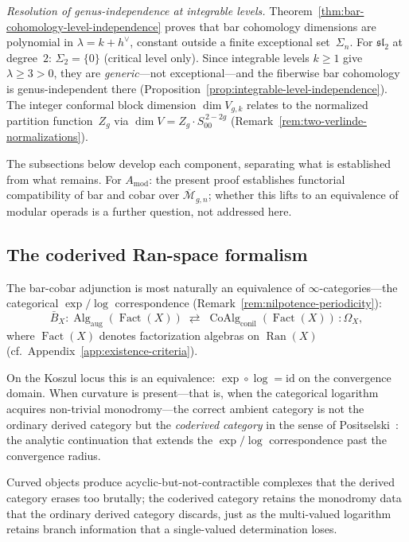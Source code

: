 \begin{remark}
\smallskip\noindent
\emph{Resolution of genus-independence at integrable levels.}
Theorem~\ref{thm:bar-cohomology-level-independence} proves that
bar cohomology dimensions are polynomial in $\lambda = k + h^\vee$,
constant outside a finite exceptional set~$\Sigma_n$.  For
$\mathfrak{sl}_2$ at degree~$2$: $\Sigma_2 = \{0\}$ (critical level
only).  Since integrable levels $k \ge 1$ give $\lambda \ge 3 > 0$,
they are \emph{generic}---not exceptional---and the fiberwise bar
cohomology is genus-independent there
(Proposition~\ref{prop:integrable-level-independence}).  The
integer conformal block dimension $\dim V_{g,k}$ relates to the
normalized partition function~$Z_g$ via $\dim V = Z_g \cdot
S_{00}^{\,2-2g}$ (Remark~\ref{rem:two-verlinde-normalizations}).
\end{remark}

\noindent
The subsections below develop each component, separating what is
established from what remains.  For $A_{\mathrm{mod}}$: the present
proof establishes functorial compatibility of bar and cobar over
$\overline{\mathcal{M}}_{g,n}$; whether this lifts to an equivalence
of modular operads is a further question, not addressed here.

\medskip

\subsection{The coderived Ran-space formalism}
\label{subsec:coderived-ran}

The bar-cobar adjunction is most naturally an equivalence of
$\infty$-categories---the categorical $\exp/\log$ correspondence
(Remark~\ref{rem:nilpotence-periodicity}):
\[
\bar{B}_X \colon
\operatorname{Alg}_{\mathrm{aug}}(\operatorname{Fact}(X))
\;\rightleftarrows\;
\operatorname{CoAlg}_{\mathrm{conil}}(\operatorname{Fact}(X))
\,:\!\Omega_X,
\]
where $\operatorname{Fact}(X)$ denotes factorization algebras on
$\operatorname{Ran}(X)$ (cf.\ Appendix~\ref{app:existence-criteria}).

On the Koszul locus this is an equivalence: $\exp \circ \log = \mathrm{id}$
on the convergence domain.  When curvature is present---that is,
when the categorical logarithm acquires non-trivial monodromy---the
correct ambient category is not the ordinary derived category but the
\emph{coderived category} in the sense of
Positselski~\cite{Positselski11}: the analytic continuation that
extends the $\exp/\log$ correspondence past the convergence radius.

Curved objects produce acyclic-but-not-contractible complexes that the
derived category erases too brutally; the coderived category retains
the monodromy data that the ordinary derived category discards, just
as the multi-valued logarithm retains branch information that a
single-valued determination loses.

